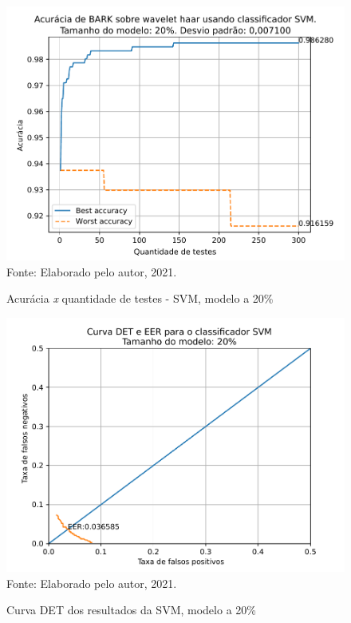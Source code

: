 			\begin{figure}[H]
				\centering
				\caption{Acurácia \textit{x} quantidade de testes - SVM, modelo a 20\%}
				\includegraphics[width=.9\linewidth]{images/results/confusionMatrices/classifier_SVM_20}
				\label{fig:classifiersvm20}
				\\Fonte: Elaborado pelo autor, 2021.
			\end{figure}
		
			\begin{figure}[H]
				\centering
				\caption{Curva DET dos resultados da SVM, modelo a 20\%}
				\includegraphics[width=.9\linewidth]{images/results/det/DET_for_classifier_SVM_20}
				\label{fig:detsvm20}
				\\Fonte: Elaborado pelo autor, 2021.
			\end{figure}

